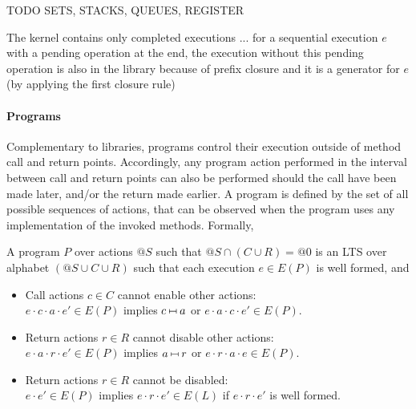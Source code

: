 \begin{example}

TODO SETS, STACKS, QUEUES, REGISTER

The kernel contains only completed executions ... for a sequential execution $e$ with a pending operation at the end, the execution without this pending operation is also in the library because of prefix closure and it is a generator for $e$ (by applying the first closure rule)

\end{example}

\paragraph{Programs}

Complementary to libraries, programs control their execution outside of method
call and return points. Accordingly, any program action performed in the
interval between call and return points can also be performed should the call
have been made later, and/or the return made earlier. A program is defined 
by the set of all possible sequences of actions, that can be observed when the program 
uses any implementation of the invoked methods. Formally, 

\begin{definition}
A program $P$
over actions $@S$ such that $@S \cap (C \cup R) = @0$ is an LTS over alphabet
$(@S \cup C \cup R)$ such that each execution $e \in E(P)$ is well formed, and
\begin{itemize}

	\item Call actions $c \in C$ cannot enable other actions: \\
  $e \cdot c \cdot a \cdot e' \in E(P)$ implies
  $c \match a$ or $e \cdot a \cdot c \cdot e' \in E(P)$.

  \item Return actions $r \in R$ cannot disable other actions: \\
  $e \cdot a \cdot r \cdot e' \in E(P)$ implies
  $a \match r$ or $e \cdot r \cdot a \cdot e \in E(P)$.

  \item Return actions $r \in R$ cannot be disabled: \\
  $e \cdot e' \in E(P)$ implies $e \cdot r \cdot e' \in E(L)$
  if $e \cdot r \cdot e'$ is well formed.

\end{itemize}
\end{definition}

